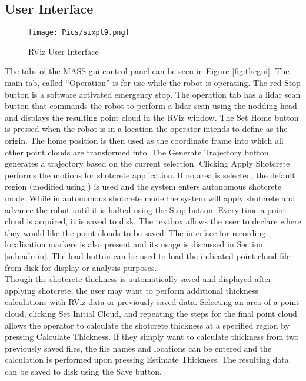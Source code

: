 \subsection{User Interface}
\label{sub:gui}
\begin{figure}[H]
    \centering
    \texttt{[image: Pics/sixpt9.png]}
    \caption{RViz User Interface}
    \label{fig:panel}
\end{figure}

The tabs of the MASS \acrshort{gui} control panel can be seen in Figure \ref{fig:thegui}. The main tab, called ``Operation'' is for use while the robot is operating. The red Stop button is a software activated emergency stop. The operation tab has a \acrshort{lidar} scan button that commands the robot to perform a \acrshort{lidar} scan using the nodding head and displays the resulting point cloud in the RViz window. The Set Home button is pressed when the robot is in a location the operator intends to define as the origin. The home position is then used as the coordinate frame into which all other point clouds are transformed into. The Generate Trajectory button generates a trajectory based on the current selection. Clicking Apply Shotcrete performs the motions for shotcrete application. If no area is selected, the default region (modified using ) is used and the system enters autonomous shotcrete mode. While in autonomous shotcrete mode the system will apply shotcrete and advance the robot until it is halted using the Stop button. Every time a point cloud is acquired, it is saved to disk. The textbox allows the user to declare where they would like the point clouds to be saved. The interface for recording localization markers is also present and its usage is discussed in Section \ref{sub:admin}. The load button can be used to load the indicated point cloud file from disk for display or analysis purposes.\\

Though the shotcrete thickness is automatically saved and displayed after applying shotcrete, the user may want to perform additional thickness calculations with RViz data or previously saved data. Selecting an area of a point cloud, clicking Set Initial Cloud, and repeating the steps for the final point cloud allows the operator to calculate the shotcrete thickness at a specified region by pressing Calculate Thickness. If they simply want to calculate thickness from two previously saved files, the file names and locations can be entered and the calculation is performed upon pressing Estimate Thickness. The resulting data can be saved to disk using the Save button.\\

